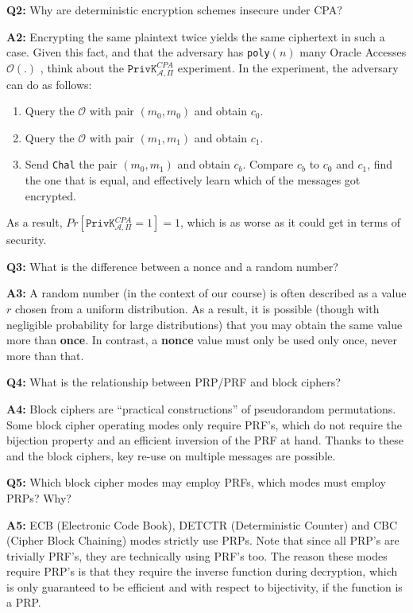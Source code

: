 \documentclass[12pt,reqno]{amsart}
\newcommand{\code}[1]{\texttt{#1}}
\newcommand{\advrs}[0]{\mathcal{A}}
\newcommand{\oracle}[0]{\mathcal{O}}
\begin{document}
\vspace{20px}
\textbf{Q2:} Why are deterministic encryption schemes insecure under CPA?

\textbf{A2:} Encrypting the same plaintext twice yields the same ciphertext in such a case. Given this fact, and that the adversary has \code{poly}$(n)$ many Oracle Accesses $\oracle(.)$ , think about the $\code{PrivK}_{\advrs,\Pi}^{CPA}$ experiment. In the experiment, the adversary can do as follows:
\begin{enumerate}
	\item Query the $\oracle$ with pair $(m_0,m_0)$ and obtain $c_0$.
	\item Query the $\oracle$ with pair $(m_1,m_1)$ and obtain $c_1$.
	\item Send \code{Chal} the pair $(m_0,m_1)$ and obtain $c_b$. Compare $c_b$ to $c_0$ and $c_1$, find the one that is equal, and effectively learn which of the messages got encrypted. 
\end{enumerate}
As a result, $Pr[\code{PrivK}_{\advrs,\Pi}^{CPA}=1] = 1$, which is as worse as it could get in terms of security.

\vspace{20px}
\textbf{Q3:} What is the difference between a nonce and a random number?

\textbf{A3:} A random number (in the context of our course) is often described as a value $r$ chosen from a uniform distribution. As a result, it is possible (though with negligible probability for large distributions) that you may obtain the same value more than \textbf{once}. In contrast, a \textbf{nonce} value must only be used only once, never more than that. 

\vspace{20px}
\textbf{Q4:} What is the relationship between PRP/PRF and block ciphers?

\textbf{A4:} Block ciphers are ``practical constructions'' of pseudorandom permutations. Some block cipher operating modes only require PRF's, which do not require the bijection property and an efficient inversion of the PRF at hand. Thanks to these and the block ciphers, key re-use on multiple messages are possible.

\vspace{20px}
\textbf{Q5:} Which block cipher modes may employ PRFs, which modes must employ PRPs? Why?

\textbf{A5:} ECB (Electronic Code Book), DETCTR (Deterministic Counter) and CBC (Cipher Block Chaining) modes strictly use PRPs. Note that since all PRP's are trivially PRF's, they are technically using PRF's too. The reason these modes require PRP's is that they require the inverse function during decryption, which is only guaranteed to be efficient and with respect to bijectivity, if the function is a PRP. 
\end{document}
